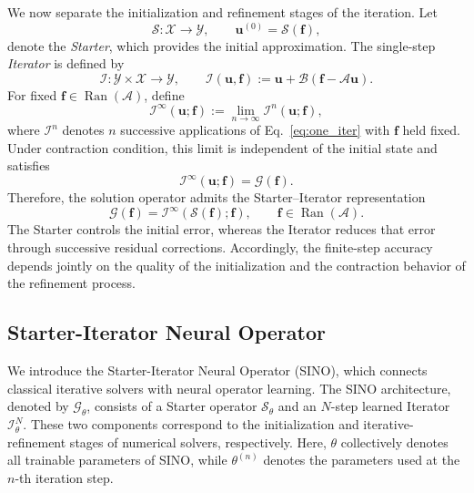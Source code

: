 \documentclass[preprint,numbers,sort&compress]{elsarticle}
\begin{document}
		We now separate the initialization and refinement stages of the iteration. Let 
		\[
		\mathcal S:\mathcal X\to\mathcal Y,
		\qquad
		\boldsymbol u^{(0)}
		=
		\mathcal S(\boldsymbol f),
		\]
		denote the \emph{Starter}, which provides the initial approximation. The single-step \emph{Iterator} is defined by
		\begin{equation}
			\label{eq:one_iter}
			\mathcal I: \mathcal Y\times\mathcal X \to \mathcal Y,
			\qquad
			\mathcal I(\boldsymbol u,\boldsymbol f):=
			\boldsymbol u
			+
			\mathcal B\left(\boldsymbol f-\mathcal A\boldsymbol u\right).
		\end{equation}
		For fixed $\boldsymbol f\in\operatorname{Ran}(\mathcal A)$, define
		\[
		\mathcal I^\infty(\boldsymbol u;\boldsymbol f)
		:=
		\lim_{n\to\infty}
		\mathcal I^n(\boldsymbol u;\boldsymbol f),
		\]
		where $\mathcal I^n$ denotes $n$ successive applications of
		Eq.~\eqref{eq:one_iter} with $\boldsymbol f$ held fixed. Under
		contraction condition, this limit is independent of the initial state and satisfies
		\[
		\mathcal I^\infty(\boldsymbol u;\boldsymbol f)
		=
		\mathcal G(\boldsymbol f).
		\]
		Therefore, the solution operator admits the Starter--Iterator
		representation
		\[
		\mathcal G(\boldsymbol f)
		=
		\mathcal I^\infty
		\left(
		\mathcal S(\boldsymbol f);
		\boldsymbol f
		\right),
		\qquad
		\boldsymbol f\in\operatorname{Ran}(\mathcal A).
		\]
		The Starter controls the initial error, whereas the Iterator reduces that error through successive residual corrections. Accordingly, the finite-step accuracy depends jointly on the quality of the initialization and the contraction behavior of the refinement process.
		
		
		
		\subsection{Starter-Iterator Neural Operator}
		\label{math_form}
		
		We introduce the Starter-Iterator Neural Operator (SINO), which connects classical iterative solvers with neural operator learning. The SINO architecture, denoted by $\mathcal G_\theta$, consists of a Starter operator $\mathcal S_\theta$ and an $N$-step learned Iterator $\mathcal I_\theta^N$. These two components correspond to the initialization and iterative-refinement stages of numerical solvers, respectively. Here,
		$\theta$ collectively denotes all trainable parameters of SINO, while $\theta^{(n)}$ denotes the parameters used at the $n$-th iteration step.
		
\end{document}
